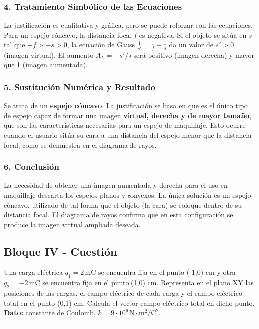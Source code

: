\subsubsection*{4. Tratamiento Simbólico de las Ecuaciones}
La justificación es cualitativa y gráfica, pero se puede reforzar con las ecuaciones. Para un espejo cóncavo, la distancia focal $f$ es negativa. Si el objeto se sitúa en $s$ tal que $-f > -s > 0$, la ecuación de Gauss $\frac{1}{s'} = \frac{1}{f} - \frac{1}{s}$ da un valor de $s' > 0$ (imagen virtual). El aumento $A_L = -s'/s$ será positivo (imagen derecha) y mayor que 1 (imagen aumentada).

\subsubsection*{5. Sustitución Numérica y Resultado}
\begin{cajaresultado}
Se trata de un \textbf{espejo cóncavo}. La justificación se basa en que es el único tipo de espejo capaz de formar una imagen \textbf{virtual, derecha y de mayor tamaño}, que son las características necesarias para un espejo de maquillaje. Esto ocurre cuando el usuario sitúa su cara a una distancia del espejo menor que la distancia focal, como se demuestra en el diagrama de rayos.
\end{cajaresultado}

\subsubsection*{6. Conclusión}
\begin{cajaconclusion}
La necesidad de obtener una imagen aumentada y derecha para el uso en maquillaje descarta los espejos planos y convexos. La única solución es un espejo cóncavo, utilizado de tal forma que el objeto (la cara) se coloque dentro de su distancia focal. El diagrama de rayos confirma que en esta configuración se produce la imagen virtual ampliada deseada.
\end{cajaconclusion}

\newpage
\subsection{Bloque IV - Cuestión}
\label{subsec:IV_A_2013_jun_ord}

\begin{cajaenunciado}
Una carga eléctrica $q_1=2\,\text{mC}$ se encuentra fija en el punto (-1,0) cm y otra $q_2=-2\,\text{mC}$ se encuentra fija en el punto (1,0) cm. Representa en el plano XY las posiciones de las cargas, el campo eléctrico de cada carga y el campo eléctrico total en el punto (0,1) cm. Calcula el vector campo eléctrico total en dicho punto.
\textbf{Dato:} constante de Coulomb, $k=9\cdot10^9\,\text{N}\cdot\text{m}^2/\text{C}^2$.
\end{cajaenunciado}
\hrule

